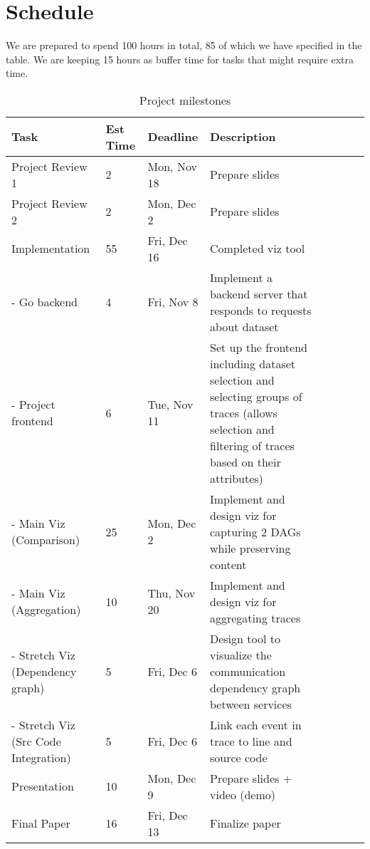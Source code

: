\section{Schedule}

We are prepared to spend 100 hours in total, 85 of which we have specified in the table.
We are keeping 15 hours as buffer time for tasks that might require extra time.
\begin{table*}[t]
    \centering
\begin{adjustbox}{width=1\textwidth}
    \begin{tabular}{l*{6}{l}r}
        \textbf{Task}              & \textbf{Est Time} & \textbf{Deadline} & \textbf{Description} \\
        \hline
        Project Review 1 & 2 & Mon, Nov 18 & Prepare slides\\
        Project Review 2 & 2 & Mon, Dec 2 & Prepare slides\\
        Implementation & 55 & Fri, Dec 16 & Completed viz tool\\
        - Go backend & 4 & Fri, Nov 8 & Implement a backend server that responds to requests about dataset\\
        - Project frontend & 6 & Tue, Nov 11 & Set up the frontend including dataset selection and selecting groups of traces (allows selection and filtering of traces based on their attributes)\\
        - Main Viz (Comparison) & 25 & Mon, Dec 2 & Implement and design viz for capturing 2 DAGs while preserving content\\
        - Main Viz (Aggregation) & 10 & Thu, Nov 20 & Implement and design viz for aggregating traces\\ 
        - Stretch Viz (Dependency graph) & 5 & Fri, Dec 6 & Design tool to visualize the communication dependency graph between services\\
        - Stretch Viz (Src Code Integration) & 5 & Fri, Dec 6 & Link each event in trace to line and source code\\
        Presentation & 10 & Mon, Dec 9 & Prepare slides + video (demo)\\
        Final Paper & 16 & Fri, Dec 13 & Finalize paper\\
        \end{tabular}
\end{adjustbox}
\caption{Project milestones}
\end{table*}